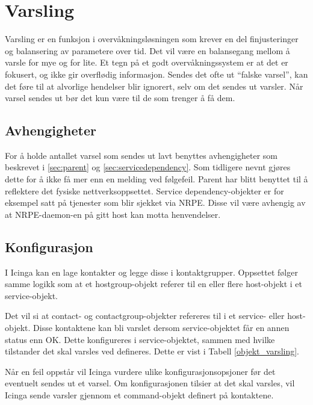 \section{Varsling}\label{sec:varsling}
Varsling er en funksjon i overvåkningsløsningen som krever en del finjusteringer og balansering av parametere over tid. Det vil være en balansegang mellom å varsle for mye og for lite. Et tegn på et godt overvåkningssystem er at det er fokusert, og ikke gir overflødig informasjon\cite{buildingnagiosmonitoring}. Sendes det ofte ut ``falske varsel'', kan det føre til at alvorlige hendelser blir ignorert, selv om det sendes ut varsler. Når varsel sendes ut bør det kun være til de som trenger å få dem.

\subsection{Avhengigheter}
For å holde antallet varsel som sendes ut lavt benyttes avhengigheter som beskrevet i \ref{sec:parent} og \ref{sec:servicedependency}. Som tidligere nevnt gjøres dette for å ikke få mer enn en melding ved følgefeil. Parent har blitt benyttet til å reflektere det fysiske nettverksoppsettet. Service dependency-objekter er for eksempel satt på tjenester som blir sjekket via NRPE. Disse vil være avhengig av at NRPE-daemon-en på gitt host kan motta henvendelser.

\subsection{Konfigurasjon}
I Icinga kan en lage kontakter og legge disse i kontaktgrupper. Oppsettet følger samme logikk som at et hostgroup-objekt referer til en eller flere host-objekt i et service-objekt.

Det vil si at contact- og contactgroup-objekter refereres til i et service- eller host-objekt. Disse kontaktene kan bli varslet dersom service-objektet får en annen status enn OK. Dette konfigureres i service-objektet, sammen med hvilke tilstander det skal varsles ved defineres. Dette er vist i Tabell \ref{objekt_varsling}.

Når en feil oppstår vil Icinga vurdere ulike konfigurasjonsopsjoner før det eventuelt sendes ut et varsel. Om konfigurasjonen tilsier at det skal varsles, vil Icinga sende varsler gjennom et command-objekt definert på kontaktene. 


